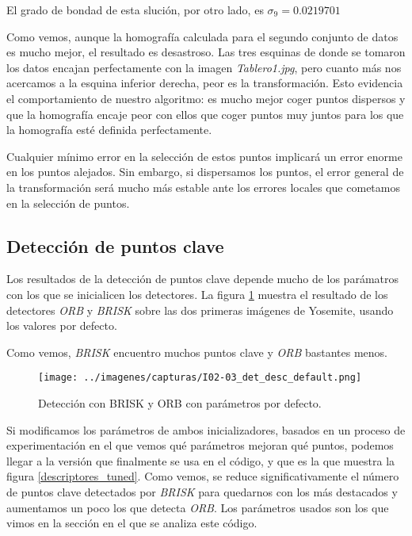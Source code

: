 \documentclass[a4paper, 11pt]{article}
\theoremstyle{definition}
\theoremstyle{theorem}
\begin{document}
    El grado de bondad de esta slución, por otro lado, es $\sigma_9 = 0.0219701$

    Como vemos, aunque la homografía calculada para el segundo conjunto de datos es mucho mejor, el resultado es desastroso. Las tres esquinas de donde se tomaron los datos encajan perfectamente con la imagen \emph{Tablero1.jpg}, pero cuanto más nos acercamos a la esquina inferior derecha, peor es la transformación. Esto evidencia el comportamiento de nuestro algoritmo: es mucho mejor coger puntos dispersos y que la homografía encaje peor con ellos que coger puntos muy juntos para los que la homografía esté definida perfectamente.

    Cualquier mínimo error en la selección de estos puntos implicará un error enorme en los puntos alejados. Sin embargo, si dispersamos los puntos, el error general de la transformación será mucho más estable ante los errores locales que cometamos en la selección de puntos.

    \subsection{Detección de puntos clave}
    Los resultados de la detección de puntos clave depende mucho de los parámatros con los que se inicialicen los detectores. La figura \ref{descriptores_default} muestra el resultado de los detectores \emph{ORB} y \emph{BRISK} sobre las dos primeras imágenes de Yosemite, usando los valores por defecto.

    Como vemos, \emph{BRISK} encuentro muchos puntos clave y \emph{ORB} bastantes menos.

    \begin{figure}[ht!]
        \centering
        \texttt{[image: ../imagenes/capturas/I02-03\_det\_desc\_default.png]}
        \caption{Detección con BRISK y ORB con parámetros por defecto. \label{descriptores_default}}
    \end{figure}

    Si modificamos los parámetros de ambos inicializadores, basados en un proceso de experimentación en el que vemos qué parámetros mejoran qué puntos, podemos llegar a la versión que finalmente se usa en el código, y que es la que muestra la figura \ref{descriptores_tuned}. Como vemos, se reduce significativamente el número de puntos clave detectados por \emph{BRISK} para quedarnos con los más destacados y aumentamos un poco los que detecta \emph{ORB}. Los parámetros usados son los que vimos en la sección en el que se analiza este código.
\end{document}

